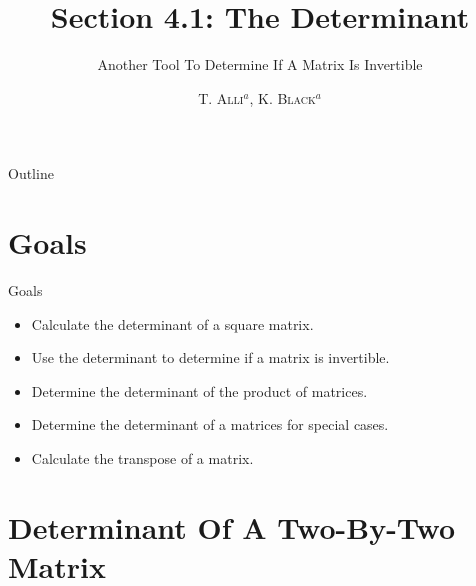 \documentclass[svgnames,table,,aspectratio=169]{beamer}
\begin{document}
\author{\textsc{T. Alli$^{a}$, K. Black$^{a}$}}
\subject{Linear Algebra}


\title{Section 4.1: The Determinant}
\subtitle{Another Tool To Determine If A Matrix Is Invertible}


\date{} %

\begin{frame}
  \titlepage
\end{frame}

\begin{frame}{Outline}
  \tableofcontents
\end{frame}


\section{Goals}

\begin{frame}{Goals}

  \begin{itemize}
  \item Calculate the determinant of a square matrix.
  \item Use the determinant to determine if a matrix is invertible.
  \item Determine the determinant of the product of matrices.
  \item Determine the determinant of a matrices for special cases.
  \item Calculate the transpose of a matrix.
  \end{itemize}

\end{frame}

\section{Determinant Of A Two-By-Two Matrix}
\end{document}
